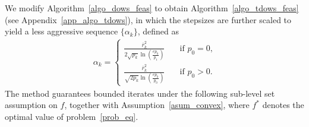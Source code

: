 \documentclass{article}
\theoremstyle{plain}
\theoremstyle{definition}
\theoremstyle{remark}
\begin{document}
We modify Algorithm~\ref{algo_dows_feas} to obtain Algorithm~\ref{algo_tdows_feas} (see Appendix~\ref{app_algo_tdows}), in which the stepsizes are further scaled to yield a less aggressive sequence $\{\alpha_k\}$, defined as
\begin{align*}
    \alpha_k = \begin{cases}
        \frac{\bar{r}_k^2}{2 \sqrt{p_k} \ln \left( \frac{e p_k}{p_1} \right)} \quad &\text{if $p_0 = 0$,} \\
        \frac{\bar{r}_k^2}{\sqrt{2 p_k} \ln \left( \frac{e p_k}{p_0} \right)} \quad &\text{if $p_0 > 0$.}
    \end{cases}
\end{align*}
%
The method guarantees bounded iterates under the following sub-level set assumption on $f$, together with Assumption~\ref{asum_convex}, where $f^*$ denotes the optimal value of problem~\eqref{prob_eq}.
%
%
\end{document}
